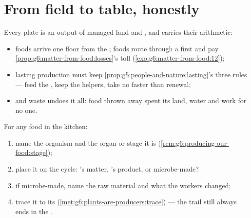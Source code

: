 \section{From field to table, honestly}

\begin{proposition}\label{prop:g6:producing-our-food:costs}
Every plate is an output of managed land and ,
and carries their arithmetic:
\begin{itemize}
  \item {} foods arrive one floor from the ; 
        foods route through a  first and pay
        \cref{prop:g6:matter-from-food:losses}'s toll
        (\cref{exo:g6:matter-from-food:12});
  \item lasting production must keep
        \cref{prop:g5:people-and-nature:lasting}'s three
        rules --- feed the , keep the helpers, take no
        faster than renewal;
  \item and waste undoes it all: food thrown away spent its
        land, water and work for no one.
\end{itemize}
\end{proposition}
\admitted

\begin{method}\label{met:g6:producing-our-food:read}
For any food in the kitchen:
\begin{enumerate}
  \item name the organism and the organ or stage it is
        (\cref{rem:g6:producing-our-food:stage});
  \item place it on the cycle: 's matter, 's
        product, or microbe-made?
  \item if microbe-made, name the raw material and what the
        workers changed;
  \item trace it to its 
        (\cref{met:g6:plants-are-producers:trace}) --- the
        trail still always ends in the .
\end{enumerate}
\end{method}

